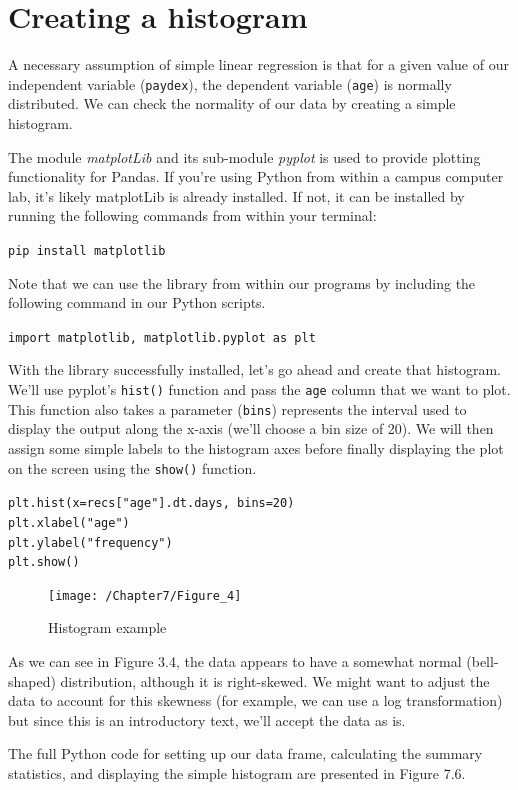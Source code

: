 \documentclass{book}
\begin{document}
\section{Creating a histogram}

A necessary assumption of simple linear regression is that for a given value of our independent variable (\texttt{paydex}), the dependent variable (\texttt{age}) is normally distributed. We can check the normality of our data by creating a simple histogram.

The module \textit{matplotLib} and its sub-module \textit{pyplot} is used to provide plotting functionality for Pandas. If you're using Python from within a campus computer lab, it's likely matplotLib is already installed. If not, it can be installed by running the following commands from within your terminal:

\texttt{pip install matplotlib}

Note that we can use the library from within our programs by including the following command in our Python scripts.

\texttt{import matplotlib, matplotlib.pyplot as plt}

With the library successfully installed, let's go ahead and create that histogram. We'll use pyplot's \texttt{hist()} function and pass the \texttt{age} column that we want to plot. This function also takes a parameter (\texttt{bins}) represents the interval used to display the output along the x-axis (we'll choose a bin size of 20). We will then assign some simple labels to the histogram axes before finally displaying the plot on the screen using the \texttt{show()} function.

\texttt{plt.hist(x=recs["age"].dt.days, bins=20) \\
plt.xlabel("age") \\
plt.ylabel("frequency") \\
plt.show()}

\begin{figure}[h]
	\caption{Histogram example}
	\centering\texttt{[image: /Chapter7/Figure\_4]}
\end{figure}

As we can see in Figure 3.4, the data appears to have a somewhat normal (bell-shaped) distribution, although it is right-skewed. We might want to adjust the data to account for this skewness (for example, we can use a log transformation) but since this is an introductory text, we'll accept the data as is. 

The full Python code for setting up our data frame, calculating the summary statistics, and displaying the simple histogram are presented in Figure 7.6.
\end{document}

